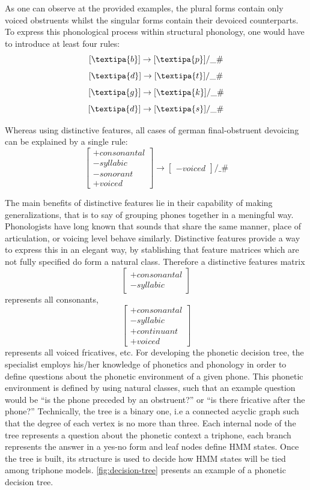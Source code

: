 As one can observe at the provided examples, the plural forms contain only voiced obstruents whilst the singular forms contain their 
devoiced counterparts. To express this phonological process within structural phonology, one would have to introduce at
least four rules:
\[
[\textipa{b}] \rightarrow [\textipa{p}]  / \_ \# 
\]
\[
[\textipa{d}] \rightarrow [\textipa{t}]  / \_ \#
\]
\[
[\textipa{g}] \rightarrow [\textipa{k}]  / \_ \#
\]
\[
[\textipa{d}] \rightarrow [\textipa{s}]  / \_ \#
\]

Whereas using distinctive features, all cases of german final-obstruent devoicing can be explained by a single rule:
\[
\begin{bmatrix}
+consonantal \\ -syllabic \\ -sonorant \\ +voiced
\end{bmatrix} \rightarrow 
\begin{bmatrix}
-voiced
\end{bmatrix}
 / \_ \#
\]

The main benefits of distinctive features lie in their capability of making generalizations, that is to say
of grouping phones together in a meningful way.  Phonologists have long known that sounds that share the same manner, 
place of articulation, or voicing level behave similarly. Distinctive features provide a way to express this
in an elegant way, by stablishing that feature matrices which are not fully specified do form a natural class. 
Therefore a distinctive features matrix
\[
\begin{bmatrix}
+consonantal \\ -syllabic
\end{bmatrix}
\]
represents all consonants,
\[
\begin{bmatrix}
+consonantal \\ -syllabic \\ +continuant \\ +voiced
\end{bmatrix}
\]
represents all voiced fricatives, etc. For developing the phonetic decision tree, the specialist employs his/her 
knowledge of phonetics and phonology in order to define questions about the phonetic environment of a given 
phone. This phonetic environment is defined by using natural classes, such that an example question would
be ``is the phone preceded by an obstruent?'' or ``is there fricative after the phone?'' Technically, the tree is a 
binary one, i.e a connected acyclic graph such that the degree of each vertex is no more than three. Each
internal node of the tree represents a question about the phonetic context a triphone, each branch represents the answer in a yes-no
form and leaf nodes define \ac{HMM} states. Once the tree is built, its structure is used to decide how \ac{HMM} states will
be tied among triphone models. \autoref{fig:decision-tree} presents an example of a phonetic decision tree.

